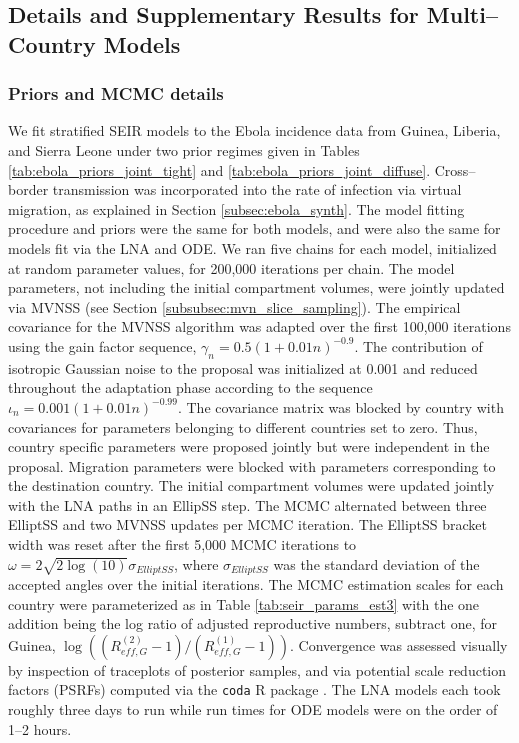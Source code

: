 \newpage
\subsection{Details and Supplementary Results for Multi--Country Models}
\label{subsec:ebola_joint_supplement}

\subsubsection{Priors and MCMC details}
\label{subsubsec:ebola_joint_mcmc}

We fit stratified SEIR models to the Ebola incidence data from Guinea, Liberia, and Sierra Leone under two prior regimes given in Tables \ref{tab:ebola_priors_joint_tight} and \ref{tab:ebola_priors_joint_diffuse}. Cross--border transmission was incorporated into the rate of infection via virtual migration, as explained in Section \ref{subsec:ebola_synth}.  The model fitting procedure and priors were the same for both models, and were also the same for models fit via the LNA and ODE. We ran five chains for each model, initialized at random parameter values, for 200,000 iterations per chain. The model parameters, not including the initial compartment volumes, were jointly updated via MVNSS (see Section \ref{subsubsec:mvn_slice_sampling}). The empirical covariance for the MVNSS algorithm was adapted over the first 100,000 iterations using the gain factor sequence, $\gamma_n = 0.5(1 + 0.01n)^{-0.9}$. The contribution of isotropic Gaussian noise to the proposal was initialized at 0.001 and reduced throughout the adaptation phase according to the sequence $ \iota_n = 0.001(1 + 0.01n)^{-0.99} $. The covariance matrix was blocked by country with covariances for parameters belonging to different countries set to zero. Thus, country specific parameters were proposed jointly but were independent in the proposal. Migration parameters were blocked with parameters corresponding to the destination country. The initial compartment volumes were updated jointly with the LNA paths in an EllipSS step. The MCMC alternated between three ElliptSS and two MVNSS updates per MCMC iteration. The ElliptSS bracket width was reset after the first 5,000 MCMC iterations to $ \omega = 2\sqrt{2\log(10)}\sigma_{ElliptSS}$, where $ \sigma_{ElliptSS} $ was the standard deviation of the accepted angles over the initial iterations. The MCMC estimation scales for each country were parameterized as in Table \ref{tab:seir_params_est3} with the one addition being the log ratio of adjusted reproductive numbers, subtract one, for Guinea, $ \log\left ((R_{eff,G}^{(2)}-1)/(R_{eff,G}^{(1)}-1)\right ) $. Convergence was assessed visually by inspection of traceplots of posterior samples, and via potential scale reduction factors (PSRFs) \cite{brooks1998general} computed via the \texttt{coda} R package \cite{codapackage}. The LNA models each took roughly three days to run while run times for ODE models were on the order of 1--2 hours. 

